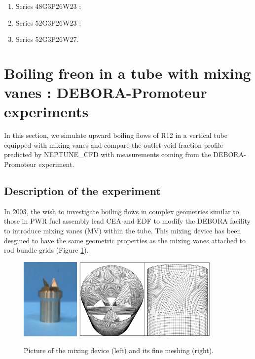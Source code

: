 \begin{enumerate}
\item Series 48G3P26W23 ;
\item Series 52G3P26W23 ; 
\item Series 52G3P26W27.
\end{enumerate}




\section{Boiling freon in a tube with mixing vanes : DEBORA-Promoteur experiments}
\label{sec:deb_prom}

In this section, we simulate upward boiling flows of R12 in a vertical tube equipped with mixing vanes and compare the outlet void fraction profile predicted by NEPTUNE\_CFD with measurements coming from the DEBORA-Promoteur experiment.

\subsection{Description of the experiment}

In 2003, the wish to investigate boiling flows in complex geometries similar to those in PWR fuel assembly lead CEA and EDF to modify the DEBORA facility to introduce mixing vanes (MV) within the tube. This mixing device has been desgined to have the same geometric properties as the mixing vanes attached to rod bundle grids (Figure \ref{fig:promoteur}).

%
\begin{figure}[!htb]
\centering
\includegraphics[height=4cm]{img/DEBORA-Promoteur/prom_pic.png}
\includegraphics[height=4cm]{img/DEBORA-Promoteur/medium_mesh.PNG}
\caption{Picture of the mixing device (left) and its fine meshing (right).}
\label{fig:promoteur}
\end{figure}
%


